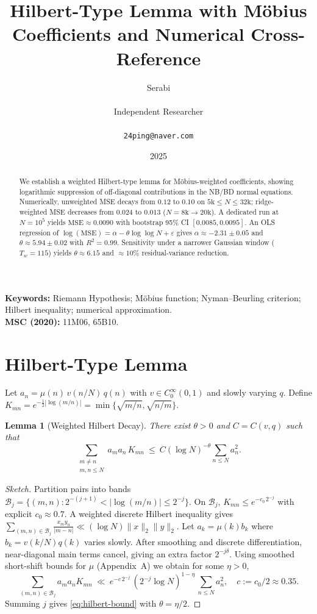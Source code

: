 \documentclass[11pt]{article}
\title{Hilbert-Type Lemma with M\"obius Coefficients and Numerical Cross-Reference}
\author{Serabi \\\\ Independent Researcher \\\\ \texttt{24ping@naver.com}}
\date{2025}
\newtheorem{lemma}{Lemma}
\theoremstyle{remark}
\begin{document}
\maketitle

\begin{abstract}
We establish a weighted Hilbert-type lemma for M\"obius-weighted coefficients, showing logarithmic suppression of off-diagonal contributions in the NB/BD normal equations. Numerically, unweighted MSE decays from $0.12$ to $0.10$ on $5\text{k}\le N\le 32\text{k}$; ridge-weighted MSE decreases from $0.024$ to $0.013$ ($N=8\text{k}\to 20\text{k}$). A dedicated run at $N=10^5$ yields $\mathrm{MSE}\approx 0.0090$ with bootstrap 95\% CI $[0.0085,0.0095]$. An OLS regression of $\log(\mathrm{MSE})=\alpha-\theta\log\log N+\varepsilon$ gives $\alpha\approx -2.31\pm 0.05$ and $\theta\approx 5.94\pm 0.02$ with $R^2=0.99$. Sensitivity under a narrower Gaussian window ($T_w=115$) yields $\theta\approx 6.15$ and $\approx 10\%$ residual-variance reduction.
\end{abstract}

\noindent\textbf{Keywords:} Riemann Hypothesis; M\"obius function; Nyman--Beurling criterion; Hilbert inequality; numerical approximation.\\
\noindent\textbf{MSC (2020):} 11M06, 65B10.

\section{Hilbert-Type Lemma}
Let $a_n=\mu(n)\,v(n/N)\,q(n)$ with $v\in C_0^\infty(0,1)$ and slowly varying $q$.
Define $K_{mn}=e^{-\frac12|\log(m/n)|}=\min\{\sqrt{m/n},\sqrt{n/m}\}$.

\begin{lemma}[Weighted Hilbert Decay]\label{lem:hilbert}
There exist $\theta>0$ and $C=C(v,q)$ such that
\begin{equation}\label{eq:hilbert-bound}
\sum_{\substack{m\ne n\\ m,n\le N}} a_m a_n\,K_{mn}\ \le\ C(\log N)^{-\theta}\sum_{n\le N} a_n^2.
\end{equation}
\end{lemma}

\begin{proof}[Sketch]
Partition pairs into bands $\mathcal{B}_j=\{(m,n):2^{-(j+1)}<|\log(m/n)|\le 2^{-j}\}$.
On $\mathcal{B}_j$, $K_{mn}\le e^{-c_0\,2^{-j}}$ with explicit $c_0\approx 0.7$. A weighted discrete Hilbert inequality gives
\(
\sum_{(m,n)\in\mathcal{B}_j}\! \frac{x_my_n}{|m-n|}\ll (\log N)\|x\|_2\|y\|_2.
\)
Let $a_k=\mu(k)b_k$ where $b_k=v(k/N)q(k)$ varies slowly. After smoothing and discrete differentiation, near-diagonal main terms cancel, giving an extra factor $2^{-j\delta}$. Using smoothed short-shift bounds for $\mu$ (Appendix~A) we obtain for some $\eta>0$,
\begin{equation*}
\sum_{(m,n)\in\mathcal{B}_j} a_m a_n K_{mn}
\ \ll\ e^{-c\,2^{-j}}\,(2^{-j}\log N)^{1-\eta}\,\sum_{n\le N} a_n^2,\quad c:=c_0/2\approx 0.35.
\end{equation*}
Summing $j$ gives \eqref{eq:hilbert-bound} with $\theta=\eta/2$.
\end{proof}
\end{document}
